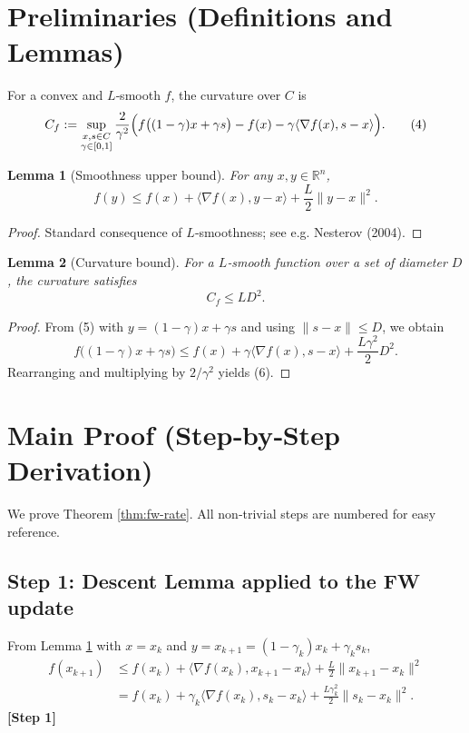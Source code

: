 \documentclass{article}
\newtheorem{lemma}{Lemma}
\begin{document}
\section*{Preliminaries (Definitions and Lemmas)}
\begin{definition}
For a convex and $L$‑smooth $f$, the curvature over $C$ is
\[
C_f := \sup_{\substack{x,s\in C\\ \gamma\in[0,1]}}
\frac{2}{\gamma^{2}}\Bigl(f\big((1-\gamma)x+\gamma s\big)-f(x)
-\gamma\langle\nabla f(x),s-x\rangle\Bigr).
\tag{4}
\]
\end{definition}

\begin{lemma}[Smoothness upper bound]
\label{lem:smooth}
For any $x,y\in\mathbb{R}^n$,
\[
f(y) \le f(x)+\langle\nabla f(x),y-x\rangle+\frac{L}{2}\|y-x\|^{2}.
\tag{5}
\]
\end{lemma}
\begin{proof}
Standard consequence of $L$‑smoothness; see e.g. Nesterov (2004). \qedhere
\end{proof}

\begin{lemma}[Curvature bound]
\label{lem:curvature}
For a $L$‑smooth function over a set of diameter $D$, the curvature satisfies
\[
C_f \le L D^{2}.
\tag{6}
\]
\end{lemma}
\begin{proof}
From (5) with $y=(1-\gamma)x+\gamma s$ and using $\|s-x\|\le D$, we obtain
\[
f\big((1-\gamma)x+\gamma s\big) \le f(x)+\gamma\langle\nabla f(x),s-x\rangle
+\frac{L\gamma^{2}}{2}D^{2}.
\]
Rearranging and multiplying by $2/\gamma^{2}$ yields (6). \qedhere
\end{proof}
\section*{Main Proof (Step‑by‑Step Derivation)}
We prove Theorem \ref{thm:fw-rate}.  
All non‑trivial steps are numbered for easy reference.

\subsection*{Step 1: Descent Lemma applied to the FW update}
From Lemma \ref{lem:smooth} with $x=x_k$ and $y=x_{k+1}=(1-\gamma_k)x_k+\gamma_k s_k$,
\begin{align}
f(x_{k+1}) &\le f(x_k)+\langle\nabla f(x_k),x_{k+1}-x_k\rangle
+\frac{L}{2}\|x_{k+1}-x_k\|^{2} \nonumber\\
&= f(x_k)+\gamma_k\langle\nabla f(x_k),s_k-x_k\rangle
+\frac{L\gamma_k^{2}}{2}\|s_k-x_k\|^{2}. \tag{7}
\end{align}
\textbf{[Step 1]}
\end{document}
